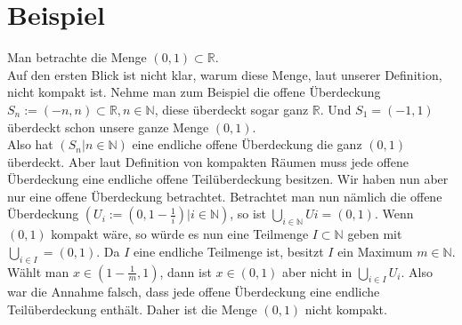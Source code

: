 \section{Beispiel}
Man betrachte die Menge \( (0,1) \subset \mathbb{R} \).\\ Auf den ersten Blick ist nicht klar, warum diese Menge, laut unserer Definition, nicht kompakt ist. 
Nehme man zum Beispiel die offene Überdeckung \( S_{n} := (-n,n) \subset \mathbb{R} , n \in \mathbb{N} \), diese überdeckt sogar ganz \(  \mathbb{R} \). 
Und \( S_{1} = (-1,1)  \) überdeckt schon unsere ganze Menge \( (0,1) \). \\
Also hat \( (S_{n} | n \in \mathbb{N} ) \) eine endliche offene Überdeckung die ganz \( (0,1)\) überdeckt.
Aber laut Definition von kompakten Räumen muss jede offene Überdeckung eine endliche offene Teilüberdeckung besitzen. Wir haben nun aber nur eine offene Überdeckung betrachtet. Betrachtet man nun nämlich die offene Überdeckung \( (U_{i}:= (0,1-\frac{1}{i})| i \in \mathbb{N}) \), so ist \(\bigcup_{i \in \mathbb{N}} U{i} = (0,1) \). Wenn \( (0,1)  \) kompakt wäre, 
so würde es nun eine Teilmenge \(I \subset \mathbb{N} \) geben mit \(\bigcup_{i \in I} = (0,1) \).
Da \(I\) eine endliche Teilmenge ist, besitzt \(I\) ein Maximum \( m \in \mathbb{N} \). Wählt man \(x \in (1-\frac{1}{m},1) \), dann ist \(x \in (0,1) \) aber nicht in 
\(\bigcup_{i \in I} U_{i}\). Also war die Annahme falsch, dass jede offene Überdeckung eine endliche Teilüberdeckung enthält. Daher ist die Menge \((0,1) \) nicht kompakt.\\
%		
